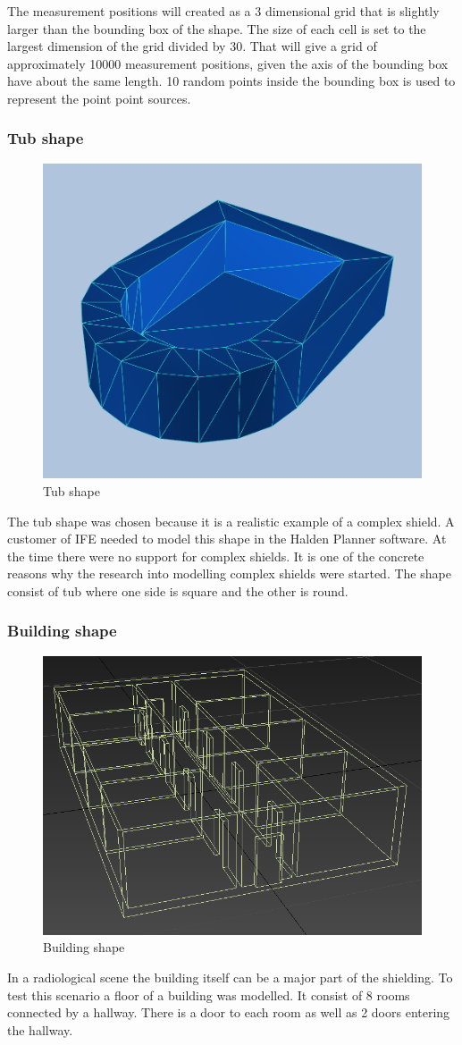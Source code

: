 \documentclass[11pt,twoside,a4paper]{report}
\begin{document}
The measurement positions will created as a 3 dimensional grid that is slightly larger than the bounding box of the shape. The size of each cell is set to the largest dimension of the grid divided by 30. That will give a grid of approximately 10000 measurement positions, given the axis of the bounding box have about the same length. 10 random points inside the bounding box is used to represent the point point sources. 

\subsubsection{Tub shape}
\begin{figure}[h]
    \centering
    \includegraphics[width=0.45\linewidth]{images/tub_mesh}
    \caption{Tub shape}
    \label{fig:Tub shape}
\end{figure}

The tub shape was chosen because it is a realistic example of a complex shield. A customer of IFE needed to model this shape in the Halden Planner software. At the time there were no support for complex shields. It is one of the concrete reasons why the research into modelling complex shields were started. The shape consist of tub where one side is square and the other is round.

\subsubsection{Building shape}
\begin{figure}[h]
    \centering
    \includegraphics[width=0.45\linewidth]{images/room_max}
    \caption{Building shape}
    \label{fig:Building shape}
\end{figure}
In a radiological scene the building itself can be a major part of the shielding. To test this scenario a floor of a building was modelled. It consist of 8 rooms connected by a hallway. There is a door to each room as well as 2 doors entering the hallway.
\end{document}
